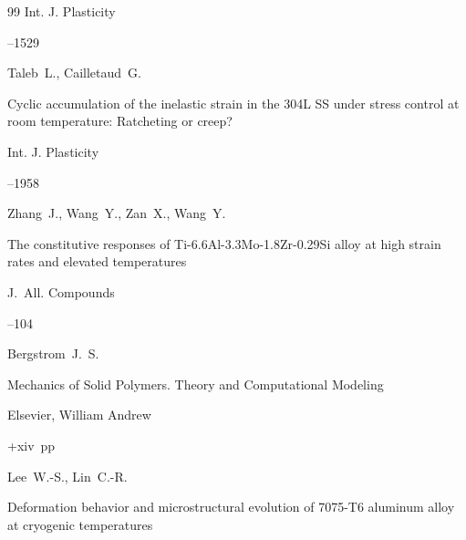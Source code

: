 \begin{thebibliography}{99}
\jour Int. J. Plasticity




--1529







\by Taleb~L., Cailletaud~G. 

\paper Cyclic accumulation of the inelastic strain in the 304L SS under stress control at room temperature: Ratcheting or creep? 

\jour Int. J. Plasticity




--1958


 


\by Zhang~J., Wang~Y., Zan~X., Wang~Y.

\paper The constitutive responses of Ti-6.6Al-3.3Mo-1.8Zr-0.29Si alloy at high strain rates and elevated temperatures 

\jour J.~All. Compounds



--104







\by Bergstrom~J.~S.

\book Mechanics of Solid Polymers. Theory and Computational Modeling


\publ Elsevier, William Andrew

\publaddr 

+xiv~pp \nofrills







\by Lee~W.-S., Lin~C.-R.

\paper Deformation behavior and microstructural evolution of 7075-T6 aluminum alloy at cryogenic temperatures


\end{thebibliography}
